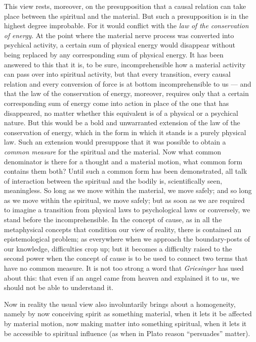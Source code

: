 \documentclass[12pt,a4paper]{book}
\newcommand{\opage}[1]{\marginnote{\footnotesize\textit{[#1]}}}
\begin{document}
This view rests, moreover, on the presupposition that a causal relation
can take place between the spiritual and the material. But such a
presupposition is in the highest degree improbable. For it would conflict
with the \emph{law of the conservation of energy}. At the point where the
material nerve process was converted into psychical activity, a certain
sum of physical energy would disappear without being replaced by any
corresponding sum of physical energy. It has been answered to this that
it is, to be sure, incomprehensible how a material activity can pass
over into spiritual activity, but that every transition, every causal
relation and every conversion of force is at bottom incomprehensible to
us --- and that the law of the conservation of energy, moreover,
requires only that a certain corresponding sum of energy come into
action in place of the one that has disappeared, no matter whether this
equivalent is of a physical or a psychical nature. But this would be a
bold and unwarranted extension of the law of the conservation of energy,
which in the form in which it stands is a purely physical law. Such an
extension would presuppose that it was possible to obtain a \emph{common
measure} for the spiritual and the material. Now what common denominator
is there for a thought and a material motion, what common form contains
them both? Until such a common form has been demonstrated, all talk of
interaction between the spiritual and the bodily is, scientifically
seen, meaningless. So long as we move within the material, we move
safely; and so long as we move within the spiritual, we move
\opage{68}safely; but as soon as we are required to imagine a
transition from physical laws to psychological laws or conversely, we
stand before the incomprehensible. In the concept of cause, as in all
the metaphysical concepts that condition our view of reality, there is
contained an epistemological problem; as everywhere when we approach the
boundary-posts of our knowledge, difficulties crop up; but it becomes a
difficulty raised to the second power when the concept of cause is to
be used to connect two terms that have no common measure. It is not too
strong a word that \emph{Griesinger} has used about this: that even if
an angel came from heaven and explained it to us, we should not be able
to understand it.

Now in reality the usual view also involuntarily brings about a
homogeneity, namely by now conceiving spirit as something material, when
it lets it be affected by material motion, now making matter into
something spiritual, when it lets it be accessible to spiritual
influence (as when in Plato reason ``persuades'' matter).
\end{document}
